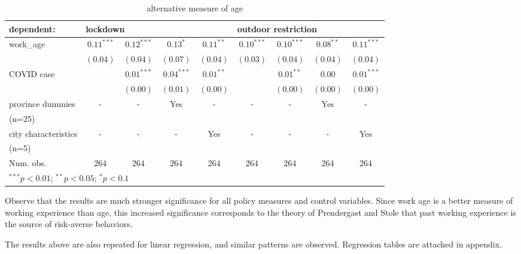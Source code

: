 \documentclass{article}
\begin{document}
\begin{CJK}{UTF8}{gbsn}
\begin{table}[H]
\caption{alternative measure of age}
\begin{center}
\begin{tabular}{l c c c c c c c c}
\hline
dependent: & \multicolumn{4}{l}{lockdown}  & \multicolumn{4}{l}{outdoor restriction}\\
\hline
work\_age      & $0.11^{***}$ & $0.12^{***}$ & $0.13^{*}$   & $0.11^{**}$ & $0.10^{***}$ & $0.10^{***}$ & $0.08^{**}$ & $0.11^{***}$ \\
               & $(0.04)$     & $(0.04)$     & $(0.07)$     & $(0.04)$    & $(0.03)$     & $(0.04)$     & $(0.04)$    & $(0.04)$     \\

COVID case     &              & $0.01^{***}$ & $0.04^{***}$ & $0.01^{**}$ &              & $0.01^{**}$  & $0.00$      & $0.01^{***}$ \\
               &              & $(0.00)$     & $(0.01)$     & $(0.00)$    &              & $(0.00)$     & $(0.00)$    & $(0.00)$     \\
province dummies &-&-&Yes&-&-&-&Yes&- \\
(n=25)\\
city characteristics &-&-&-&Yes&-&-&-&Yes \\
(n=5)\\

\hline
Num. obs.      & $264$        & $264$        & $264$        & $264$        & $264$        & $264$        & $264$       & $264$        \\
\hline
\multicolumn{9}{l}{\scriptsize{$^{***}p<0.01$; $^{**}p<0.05$; $^{*}p<0.1$}}
\end{tabular}
\label{Table 1}
\end{center}
\end{table}

Observe that the results are much stronger significance for all policy measures and control variables. Since work age is a better measure of working experience than age, this increased significance corresponds to the theory of Prendergast and Stole that past working experience is the source of risk-averse behaviors.

The results above are also repeated for linear regression, and similar patterns are observed. Regression tables are attached in appendix. 




\end{CJK}
\end{document}
